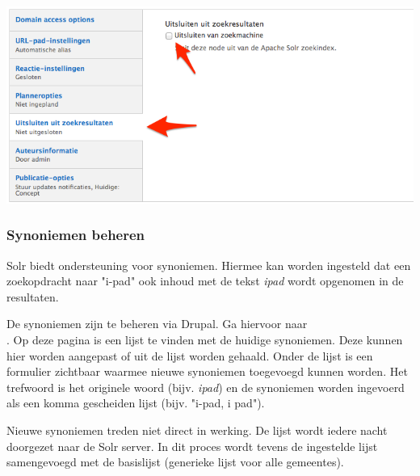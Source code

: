 \begin{center}
	\includegraphics[width=\textwidth]{img/solr-exclude.png}
\end{center}

\subsubsection{Synoniemen beheren}

Solr biedt ondersteuning voor synoniemen. Hiermee kan worden ingesteld dat een zoekopdracht naar "i-pad" ook inhoud met de tekst \emph{ipad} wordt opgenomen in de resultaten.

De synoniemen zijn te beheren via Drupal. Ga hiervoor naar \\ . Op deze pagina is een lijst te vinden met de huidige synoniemen. Deze kunnen hier worden aangepast of uit de lijst worden gehaald. Onder de lijst is een formulier zichtbaar waarmee nieuwe synoniemen toegevoegd kunnen worden. Het trefwoord is het originele woord (bijv. \emph{ipad}) en de synoniemen worden ingevoerd als een komma gescheiden lijst (bijv. "i-pad, i pad").

Nieuwe synoniemen treden niet direct in werking. De lijst wordt iedere nacht doorgezet naar de Solr server. In dit proces wordt tevens de ingestelde lijst samengevoegd met de basislijst (generieke lijst voor alle gemeentes).
